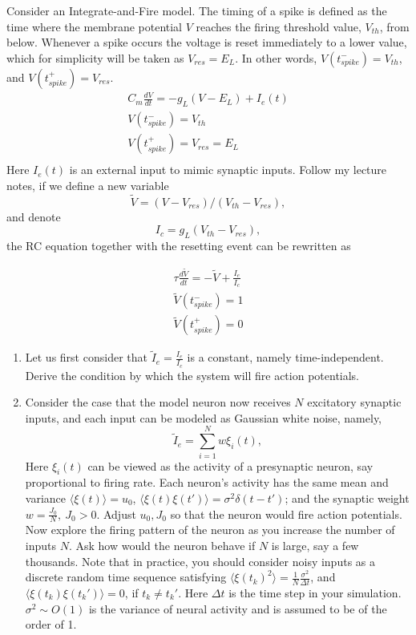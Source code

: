 \documentclass{article}
\begin{document}
Consider an Integrate-and-Fire model. The timing of a spike is defined as the time where the membrane potential $V$ reaches the firing threshold value, $V_{th}$, from below. Whenever a spike occurs the voltage is reset immediately to a lower value, which for simplicity will be taken as $V_{res}=E_L$. In other words, $V(t_{spike}^{-})=V_{th}$, and $V(t_{spike}^{+})=V_{res}$. 
\begin{equation}
\begin{aligned}
C_m\frac{dV}{dt}=-g_L(V-E_L)+I_e(t)  \\
V(t_{spike}^{-})=V_{th} \\
V(t_{spike}^{+})=V_{res} = E_L \\
\end{aligned}
\end{equation}   
Here $I_e(t)$ is an external input to mimic synaptic inputs. Follow my lecture notes, if we define a new variable \[\tilde{V} = (V-V_{res})/(V_{th}-V_{res}),\] and denote \[I_c = g_{L}(V_{th}-V_{res}),\] the RC equation together with the resetting event can be rewritten as {
\begin{equation}
\begin{aligned}
\tau\frac{d\tilde{V}}{dt}=-\tilde{V}+\frac{I_e}{I_c}   \\
\tilde{V}(t_{spike}^{-})=1 \\
\tilde{V}(t_{spike}^{+})=0
\end{aligned}
\end{equation}
\begin{enumerate}
\item Let us first consider that $\tilde{I}_e = \frac{I_e}{I_c}$ is a constant, namely time-independent. Derive the condition by which the system will fire action potentials.

\item Consider the case that the model neuron now receives $N$ excitatory synaptic inputs, and each input can be modeled as Gaussian white noise, namely, 
\[\tilde{I}_e = \sum_{i=1}^N w \xi_i(t),\] 
Here $\xi_i(t)$ can be viewed as the activity of a presynaptic neuron, say proportional to firing rate. Each neuron's activity has the same mean and variance $\langle \xi(t) \rangle = u_0$, $\langle \xi(t) \xi(t') \rangle = \sigma^2 \delta (t-t')$; and the synaptic weight $w = \frac{J_0}{N}, \ J_0 >0$. Adjust $u_0, J_0$ so that the neuron would fire action potentials. Now explore the firing pattern of the neuron as you increase the number of inputs $N$. Ask how would the neuron behave if $N$ is large, say a few thousands. Note that in practice, you should consider noisy inputs as a discrete random time sequence satisfying $\langle \xi(t_k)^2 \rangle = \frac{1}{N}\frac{\sigma^2}{\Delta t}$, and $\langle \xi(t_k) \xi(t_k') \rangle = 0$, if $t_k \neq t_k'$. Here $\Delta t$ is the time step in your simulation. $\sigma^2 \sim O(1)$ is the variance of neural activity  and is assumed to be of the order of 1. 


\end{enumerate}}
\end{document}
